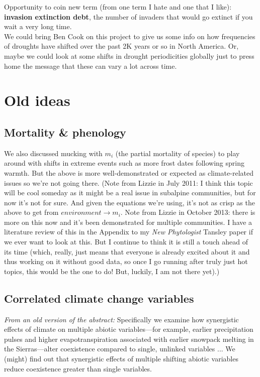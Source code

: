 \documentclass[11pt,a4paper,oneside]{article}
\begin{document}
\noindent Opportunity to coin new term (from one term I hate and one that I like): {\bf invasion extinction debt}, the number of invaders that would go extinct if you wait a very long time. \\

\noindent We could bring Ben Cook on this project to give us some info on how frequencies of droughts have shifted over the past 2K years or so in North America. Or, maybe we could look at some shifts in drought periodicities globally just to press home the message that these can vary a lot across time. 

\newpage
\section{Old ideas}

\subsection{Mortality \& phenology}

\noindent We also discussed mucking with \(m_{i}\) (the partial
mortality of species) to play around with
shifts in extreme events such as more frost dates following spring
warmth. But the above is more well-demonstrated or expected as
climate-related issues so we're not going there. (Note from Lizzie in
July 2011: I think this topic will be cool someday as it might be a
real issue in subalpine communities, but for now it's not for
sure. And given the equations we're using, it's not as crisp as the
above to get from \(environment\rightarrow m_{i}\). Note from Lizzie in October 2013: there is more on this now and it's been demonstrated for multiple communities. I have a literature review of this in the Appendix to my \emph{New Phytologist} Tansley paper if we ever want to look at this. But I continue to think it is still a touch ahead of its time (which, really, just means that everyone is already excited about it and thus working on it without good data, so once I go running after truly just hot topics, this would be the one to do! But, luckily, I am not there yet).)\\ 

\subsection{Correlated climate change variables}
\noindent \emph{From an old version of the abstract:} Specifically we examine how
synergistic effects of climate on multiple abiotic variables---for
example, earlier precipitation pulses and higher evapotranspiration
associated with earlier snowpack melting in the Sierras---alter
coexistence compared to single, unlinked variables ... We
  (might) find out that synergistic effects of multiple shifting
  abiotic variables reduce coexistence greater than single
  variables. \\
\end{document}
